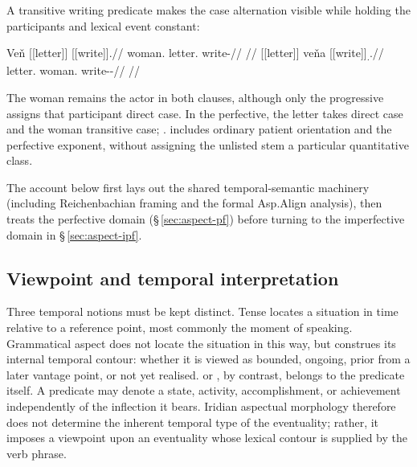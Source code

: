 A transitive writing predicate makes the case alternation visible while
holding the participants and lexical event constant:

\pex\label{ex:vm-slot-alignment}
\a
\begingl
\gla Veň \textnormal{[[letter]]}\textsubscript{\Ind{}} \textnormal{[[write]]}\textsubscript{\Prog{}}.//
\glb woman.\Dir{} letter.\Ind{} write-\Prog{}//
\glft {}
//
\endgl
\a
\begingl
\gla \textnormal{[[letter]]}\textsubscript{\Dir{}} veňa \textnormal{[[write]]}\textsubscript{\Trs{}.\Pf{}}.//
\glb letter.\Dir{} woman.\Trs{} write-\Trs{}-\Pf{}//
\glft {}
//
\endgl
\xe

The woman remains the actor in both clauses, although only the progressive
assigns that participant direct case. In the perfective, the letter takes direct
case and the woman transitive case; \Trs{}.\Pf{} includes ordinary
patient orientation and the perfective exponent, without assigning the
unlisted stem a particular quantitative class.

The account below first lays out the shared temporal-semantic machinery
(including Reichenbachian framing and the formal Asp.Align analysis), then treats
the perfective domain (§\,\ref{sec:aspect-pf}) before turning to the imperfective domain
in §\,\ref{sec:aspect-ipf}.

\subsection{Viewpoint and temporal interpretation}

Three temporal notions must be kept distinct. Tense locates a situation in time
relative to a reference point, most commonly the moment of speaking. Grammatical
aspect does not locate the situation in this way, but construes its internal
temporal contour: whether it is viewed as bounded, ongoing, prior from a later
vantage point, or not yet realised.  or ,
by contrast, belongs to the predicate itself. A predicate may denote a state,
activity, accomplishment, or achievement independently of the inflection it
bears. Iridian aspectual morphology therefore does not determine the inherent
temporal type of the eventuality; rather, it imposes a viewpoint upon an
eventuality whose lexical contour is supplied by the verb phrase.

